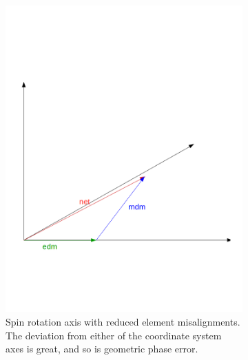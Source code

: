 \documentclass{article}
\begin{document}
\begin{figure}
  \centering
  \begin{subfigure}[b]{.5\textwidth}\centering
    \includegraphics[width=\textwidth]{img/geometric_phase_1}
    \caption{Spin rotation axis with reduced element misalignments. The deviation from either of the coordinate system axes is great, and so is geometric phase error.}
  \end{subfigure}~
  \begin{subfigure}[b]{.5\textwidth}\centering

\end{subfigure}
\end{figure}
\end{document}

